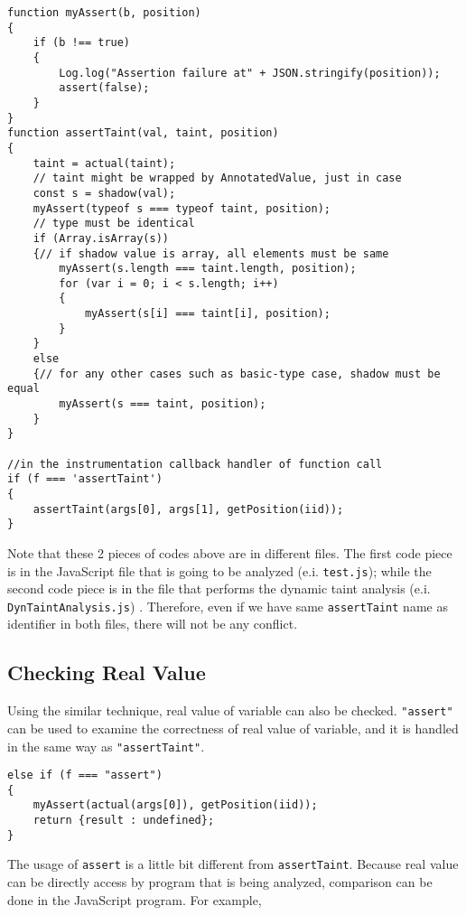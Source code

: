 \begin{verbatim}
function myAssert(b, position)
{
    if (b !== true)
    {
        Log.log("Assertion failure at" + JSON.stringify(position));
        assert(false);
    }
}
function assertTaint(val, taint, position)
{
    taint = actual(taint);
    // taint might be wrapped by AnnotatedValue, just in case
    const s = shadow(val);
    myAssert(typeof s === typeof taint, position);
    // type must be identical
    if (Array.isArray(s))
    {// if shadow value is array, all elements must be same
        myAssert(s.length === taint.length, position);
        for (var i = 0; i < s.length; i++)
        {
            myAssert(s[i] === taint[i], position);
        }
    }
    else
    {// for any other cases such as basic-type case, shadow must be equal
        myAssert(s === taint, position);
    }
}

//in the instrumentation callback handler of function call
if (f === 'assertTaint')
{
    assertTaint(args[0], args[1], getPosition(iid));
}
\end{verbatim}

Note that these 2 pieces of codes above are in different files. The first code piece is in the JavaScript file that is going to be analyzed (e.i. \texttt{test.js}); while the second code piece is in the file that performs the dynamic taint analysis (e.i. \texttt{DynTaintAnalysis.js}) . Therefore, even if we have same \texttt{assertTaint} name as identifier in both files, there will not be any conflict.

\subsection{Checking Real Value}

Using the similar technique, real value of variable can also be checked. \texttt{"assert"} can be used to examine the correctness of real value of variable, and it is handled in the same way as \texttt{"assertTaint"}. 

\begin{verbatim}
else if (f === "assert")
{
    myAssert(actual(args[0]), getPosition(iid));
    return {result : undefined};
}
\end{verbatim}

The usage of \texttt{assert} is a little bit different from \texttt{assertTaint}. Because real value can be directly access by program that is being analyzed, comparison can be done in the JavaScript program. For example,

